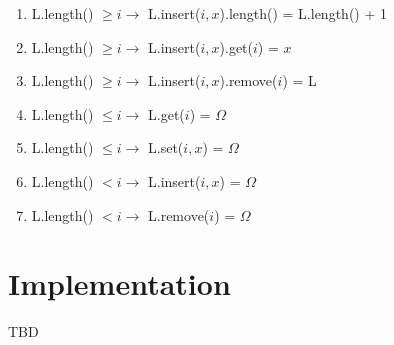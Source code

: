 \documentclass{article}
\begin{document}
\begin{enumerate}
\begin{enumerate}
  \item L.length() \(\geq i \rightarrow\) L.insert(\(i, x\)).length() = L.length() + 1
  \item L.length() \(\geq i \rightarrow\) L.insert(\(i, x\)).get(\(i\)) = \(x\)
  \item L.length() \(\geq i \rightarrow\) L.insert(\(i, x\)).remove(\(i\)) = L
  \item L.length() \(\leq i \rightarrow\) L.get(\(i\)) = \(\Omega\)
  \item L.length() \(\leq i \rightarrow\) L.set(\(i, x\)) = \(\Omega\)
  \item L.length() \(< i \rightarrow\) L.insert(\(i, x\)) = \(\Omega\)
  \item L.length() \(< i \rightarrow\) L.remove(\(i\)) = \(\Omega\)
	\end{enumerate}
\end{enumerate}


\section*{Implementation}
TBD
\end{document}
